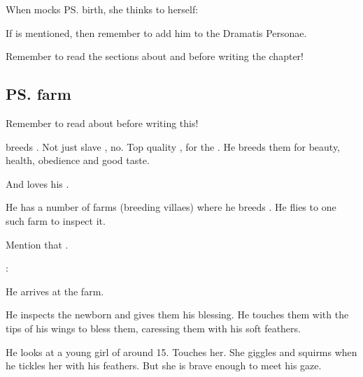 When \Teshrial{} mocks \ps{\Achsah} birth, she thinks to herself: 
  
If \Thanatzil{} is mentioned, then remember to add him to the Dramatis Personae. 

Remember to read the sections about  and  before writing the chapter!








\subsection{\ps{\Teshrial} farm}
Remember to read about  before writing this! 

\Teshrial{} breeds \humans. 
Not just slave \humans, no. 
Top quality \humans{}, for the . 
He breeds them for beauty, health, obedience and good taste. 


And \Teshrial{} loves his \humans. 

He has a number of farms (breeding villaes) where he breeds \humans. 
He flies to one such farm to inspect it. 

Mention that . 

\begin{prose}
\Teshrial: 
\end{prose}

He arrives at the farm. 

He inspects the newborn and gives them his blessing. 
He touches them with the tips of his wings to bless them, caressing them with his soft feathers. 

He looks at a young girl of around 15. 
Touches her. 
She giggles and squirms when he tickles her with his feathers. 
But she is brave enough to meet his gaze. 

